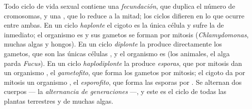 \begin{definition}\label{def:b2:plant-life-cycles:cycles}
Todo ciclo de vida sexual contiene una \emph{fecundación}, que duplica el
número de cromosomas, y una \emph{}, que lo reduce a la mitad; los
ciclos difieren en lo que ocurre entre ambas. En un ciclo
\emph{haplonte} el cigoto es la única célula  y sufre la 
de inmediato; el organismo es  y sus gametos se forman por
mitosis (\emph{Chlamydomonas}, muchas algas y hongos). En un ciclo
\emph{diplonte} la  produce directamente los gametos, que son las
únicas células , y el organismo es  (los animales, el
alga parda \emph{Fucus}). En un ciclo \emph{haplodiplonte} la 
produce \emph{esporas}, que por mitosis dan un organismo , el
\emph{gametofito}, que forma los gametos por mitosis; el cigoto da por
mitosis un organismo , el \emph{esporofito}, que forma las
esporas por . Se alternan dos cuerpos  --- la
\emph{alternancia de generaciones} ---, y este es el ciclo de todas las
plantas terrestres y de muchas algas.
\end{definition}

